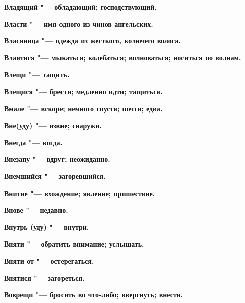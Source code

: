 \begin{mymulticols}{2}
\bfseries Владящий\normalfont{} "--- обладающий; господствующий. 




\bfseries Власти\normalfont{} "--- имя одного из чинов ангельских. 




\bfseries Власяница\normalfont{} "--- одежда из жесткого, колючего волоса. 




\bfseries Влаятися\normalfont{} "--- мыкаться; колебаться; волноваться; носиться по волнам. 




\bfseries Влещи\normalfont{} "--- тащить. 




\bfseries Влещися\normalfont{} "--- брести; медленно идти; тащиться. 




\bfseries Вмале\normalfont{} "--- вскоре; немного спустя; почти; едва. 




\bfseries Вне(уду)\normalfont{} "--- извне; снаружи. 




\bfseries Внегда\normalfont{} "--- когда. 




\bfseries Внезапу\normalfont{} "--- вдруг; неожиданно. 




\bfseries Внемшийся\normalfont{} "--- загоревшийся. 




\bfseries Внитие\normalfont{} "--- вхождение; явление; пришествие. 




\bfseries Внове\normalfont{} "--- недавно. 




\bfseries Внутрь (уду)\normalfont{} "--- внутри. 




\bfseries Вняти\normalfont{} "--- обратить внимание; услышать. 




\bfseries Вняти от\normalfont{} "--- остерегаться. 




\bfseries Внятися\normalfont{} "--- загореться. 




\bfseries Воврещи\normalfont{} "--- бросить во что-либо; ввергнуть; внести. 





\end{mymulticols}
